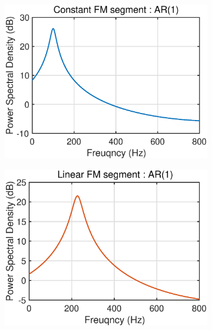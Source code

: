 \begin{figure}[htb]
     \centering
     \hspace{-0.4cm}
     \begin{subfigure}[b]{0.32\textwidth}
         \centering
         \includegraphics[width=\textwidth]{fig/32/32a5.eps}
     \end{subfigure}
    \hspace{-0.4cm}
     \begin{subfigure}[b]{0.32\textwidth}
         \centering
         \includegraphics[width=\textwidth]{fig/32/32a6.eps}
     \end{subfigure}
    \hspace{-0.4cm}

\end{figure}
